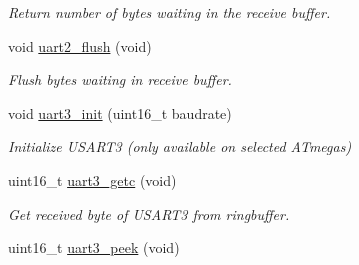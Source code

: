 \begin{DoxyCompactItemize}
\begin{DoxyCompactList}\small\item\em Return number of bytes waiting in the receive buffer. \end{DoxyCompactList}\item 
\hypertarget{group__avr-uart_gade8eed43df7ad1387c4bfa916c972abd}{}void \hyperlink{group__avr-uart_gade8eed43df7ad1387c4bfa916c972abd}{uart2\+\_\+flush} (void)\label{group__avr-uart_gade8eed43df7ad1387c4bfa916c972abd}

\begin{DoxyCompactList}\small\item\em Flush bytes waiting in receive buffer. \end{DoxyCompactList}\item 
void \hyperlink{group__avr-uart_ga62087cd1974706879fd603f8e802c674}{uart3\+\_\+init} (uint16\+\_\+t baudrate)
\begin{DoxyCompactList}\small\item\em Initialize U\+S\+A\+R\+T3 (only available on selected A\+Tmegas) \end{DoxyCompactList}\item 
uint16\+\_\+t \hyperlink{group__avr-uart_ga8ac0106d2083bdd4ee9b1d80fae1b305}{uart3\+\_\+getc} (void)
\begin{DoxyCompactList}\small\item\em Get received byte of U\+S\+A\+R\+T3 from ringbuffer. \end{DoxyCompactList}\item 
\hypertarget{group__avr-uart_gaf022a2762a5237c23734d2433fb4a8dc}{}uint16\+\_\+t \hyperlink{group__avr-uart_gaf022a2762a5237c23734d2433fb4a8dc}{uart3\+\_\+peek} (void)\label{group__avr-uart_gaf022a2762a5237c23734d2433fb4a8dc}


\end{DoxyCompactItemize}
